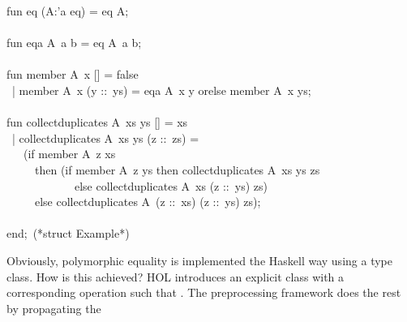 \begin{isabellebody}
\begin{isamarkuptext}
\hspace*{0pt}fun eq (A{}:'a eq) = {}eq A{};\\
\hspace*{0pt}\\
\hspace*{0pt}fun eqa A{}~a b = eq A{}~a b;\\
\hspace*{0pt}\\
\hspace*{0pt}fun member A{}~x [] = false\\
\hspace*{0pt} ~| member A{}~x (y ::~ys) = eqa A{}~x y orelse member A{}~x ys;\\
\hspace*{0pt}\\
\hspace*{0pt}fun collect{}duplicates A{}~xs ys [] = xs\\
\hspace*{0pt} ~| collect{}duplicates A{}~xs ys (z ::~zs) =\\
\hspace*{0pt} ~~~(if member A{}~z xs\\
\hspace*{0pt} ~~~~~then (if member A{}~z ys then collect{}duplicates A{}~xs ys zs\\
\hspace*{0pt} ~~~~~~~~~~~~else collect{}duplicates A{}~xs (z ::~ys) zs)\\
\hspace*{0pt} ~~~~~else collect{}duplicates A{}~(z ::~xs) (z ::~ys) zs);\\
\hspace*{0pt}\\
\hspace*{0pt}end;~(*struct Example*)%
\end{isamarkuptext}%
\isamarkuptrue%
%
\endisatagquote
{\isafoldquote}%
%
\isadelimquote
%
\endisadelimquote
%
\begin{isamarkuptext}%
\noindent Obviously, polymorphic equality is implemented the Haskell
  way using a type class.  How is this achieved?  HOL introduces
  an explicit class  with a corresponding operation
   such that .
  The preprocessing framework does the rest by propagating the

\end{isamarkuptext}
\end{isabellebody}

